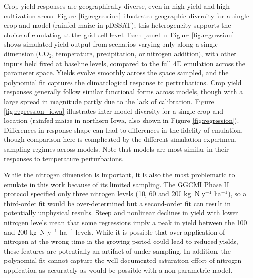 \documentclass[esd, manuscript]{copernicus} %
\begin{document}
Crop yield responses are geographically diverse, even in high-yield and high-cultivation areas. Figure \ref{fig:regression} illustrates geographic diversity for a single crop and model (rainfed maize in pDSSAT); this heterogeneity supports the choice of emulating at the grid cell level. Each panel in Figure \ref{fig:regression} shows simulated yield output from scenarios varying only along a single dimension (CO$_2$, temperature, precipitation, or nitrogen addition), with other inputs held fixed at baseline levels, compared to the full 4D emulation across the parameter space. Yields evolve smoothly across the space sampled, and the polynomial fit captures the climatological response to perturbations. Crop yield responses generally follow similar functional forms across models, though with a large spread in magnitude partly due to the lack of calibration. Figure \ref{fig:regression_iowa} illustrates inter-model diversity for a single crop and location (rainfed maize in northern Iowa, also shown in Figure \ref{fig:regression}). Differences in response shape can lead to  differences in the fidelity of emulation, though comparison here is complicated by the different simulation experiment sampling regimes across models. Note that models are most similar in their responses to temperature perturbations. 

While the nitrogen dimension is important, it is also the most problematic to emulate in this work because of its limited sampling. The GGCMI Phase II protocol specified only three nitrogen levels (10, 60 and 200 kg~N y$^{-1}$ ha$^{-1}$), so a third-order fit would be over-determined but a second-order fit can result in potentially unphysical results. Steep and nonlinear declines in yield with lower nitrogen levels mean that some regressions imply a peak in yield between the 100 and 200 kg~N y$^{-1}$ ha$^{-1}$ levels. While it is possible that over-application of nitrogen at the wrong time in the growing period could lead to reduced yields, these features are potentially an artifact of under sampling. In addition, the polynomial fit cannot capture the well-documented saturation effect of nitrogen application \citep[e.g.][]{Torsten77} as accurately as would be possible with a non-parametric model. 
\end{document}
